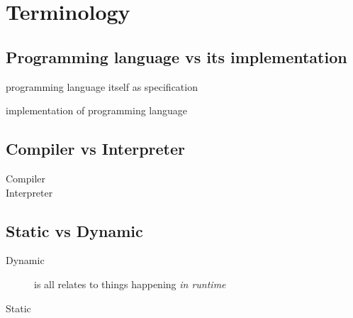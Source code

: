 \chapter{Terminology}\label{terminology}

\section{Programming language vs its implementation}\label{implementing}

\begin{description}
\item{programming language} itself as specification
\item{implementation} of programming language 
\end{description}

\section{Compiler vs Interpreter}

\begin{description}
\item[Compiler]
\item[Interpreter]
\end{description}

\section{Static vs Dynamic}

\begin{description}
\item[Dynamic]
is all relates to things happening \emph{in runtime}
\item[Static]
\end{description}
